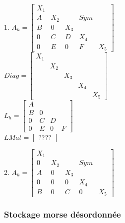 \documentclass[12pt,a4paper]{article}
\begin{document}
	\begin{ex}
		$ $\\
		
		\begin{minipage}[t]{8cm}
			1. $A_h = \begin{bmatrix}
			X_1 \\
			A & X_2 & & Sym \\
			B & 0 & X_3 \\
			0 & C & D & X_4 \\
			0 & E & 0 & F & X_5
		\end{bmatrix}$\\
		
		$Diag = \begin{bmatrix}
			X_1 \\
			& X_2 \\
			& & X_3 \\
			& & & X_4 \\
			& & & & X_5
		\end{bmatrix}$\\
		
		$L_h = \begin{bmatrix}
			A \\
			B & 0 \\
			0 & C & D \\
			0 & E & 0 & F
		\end{bmatrix}$\\
		
		$LMat = \begin{bmatrix}
			????
		\end{bmatrix}$
		
		\end{minipage}\begin{minipage}[t]{7cm}
		2. $A_h = \begin{bmatrix}
			X_1 \\
			0 & X_2 & & Sym \\
			A & 0 & X_3 \\
			0 & 0 & 0 & X_4 \\
			B & 0 & C & 0 & X_5
		\end{bmatrix}$
		\end{minipage}
	\end{ex}
	
	\subsubsection{Stockage morse désordonnée}
	
\end{document}
